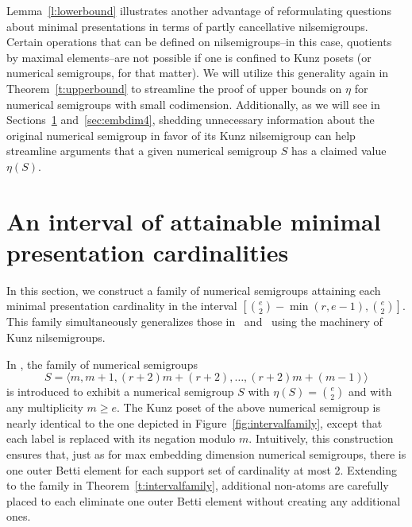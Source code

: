 \documentclass[ALCO]{cedram}
\begin{document}
\begin{rema}\label{r:generalnilsemigroups}
Lemma~\ref{l:lowerbound} illustrates another advantage of reformulating questions about minimal presentations in terms of partly cancellative nilsemigroups. 
Certain operations that can be defined on nilsemigroups--in this case, quotients by maximal elements--are not possible if one is confined to Kunz posets (or numerical semigroups, for that matter).  We will utilize this generality again in Theorem~\ref{t:upperbound} to streamline the proof of upper bounds on $\eta$ for numerical semigroups with small codimension.  
Additionally, as we will see in Sections~\ref{sec:intervalfamily} and~\ref{sec:embdim4}, shedding unnecessary information about the original numerical semigroup in favor of its Kunz nilsemigroup can help streamline arguments that a given numerical semigroup $S$ has a claimed value $\eta(S)$.  
\end{rema}







\section{An interval of attainable minimal presentation cardinalities}
\label{sec:intervalfamily}



In this section, we construct a family of numerical semigroups attaining each minimal presentation cardinality in the interval $[\binom{e}{2}-\min(r, e-1), \binom{e}{2}]$.  This family simultaneously generalizes those in~\cite{rosalesApery} and~\cite{highembdim} using the machinery of Kunz nilsemigroups.  

\begin{exam}\label{e:intervalfamily}
In \cite{rosalesApery}, the family of numerical semigroups 
\[
S = \langle  m, m+1, (r+2)m+(r+2), \dots, (r+2)m+(m-1)  \rangle
\]
is introduced to exhibit a numerical semigroup $S$ with $\eta(S) = \binom{e}{2}$ and with any multiplicity $m \ge e$.  The Kunz poset of the above numerical semigroup is nearly identical to the one depicted in Figure~\ref{fig:intervalfamily}, except that each label is replaced with its negation modulo $m$.  
Intuitively, this construction ensures that, just as for max embedding dimension numerical semigroups, there is one outer Betti element for each support set of cardinality at most 2.  Extending to the family in Theorem~\ref{t:intervalfamily}, additional non-atoms are carefully placed to each eliminate one outer Betti element without creating any additional ones.  
\end{exam}
\end{document}
